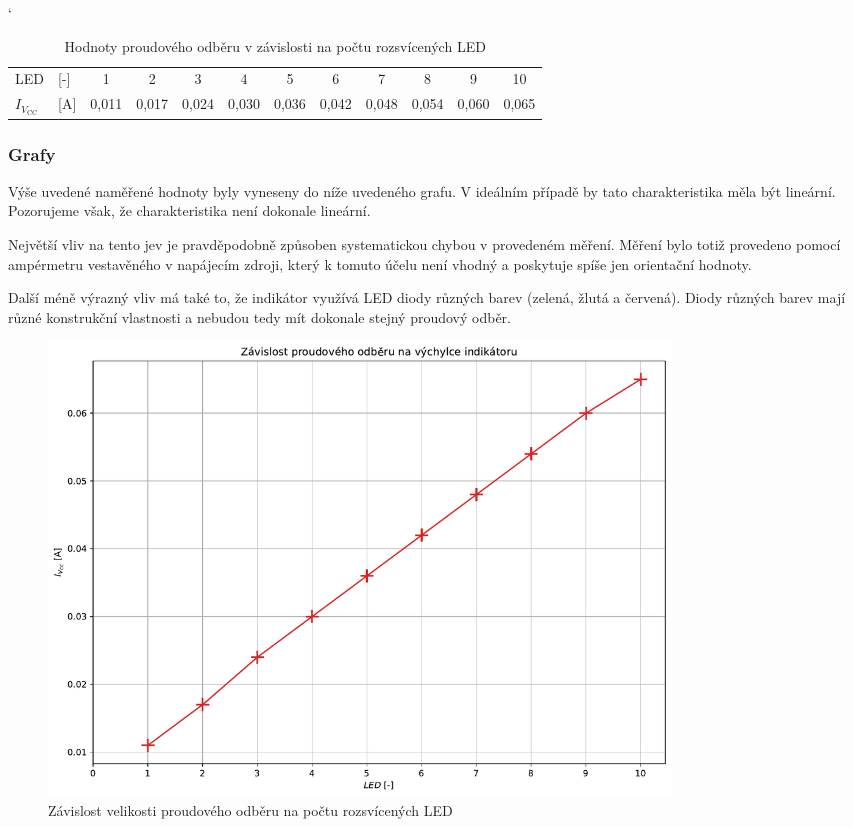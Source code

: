 \documentclass[a4paper, czech]{article}
\begin{document}
\begin{table}[H]
    \catcode`
    \centering
    \caption{Hodnoty proudového odběru v závislosti na počtu rozsvícených LED}
    \begin{tabular}{ll|cccccccccc}
        \toprule
        LED & [-]              & 1     & 2     & 3     & 4     & 5     & 6     & 7     & 8     & 9     & 10    \\
        \cmidrule(rl){1-12}
        $I_{V_{\text{CC}}}$ & {[}A{]} & 0,011 & 0,017 & 0,024 & 0,030 & 0,036 & 0,042 & 0,048 & 0,054 & 0,060 & 0,065 \\
        \bottomrule
    \end{tabular}
\end{table}

\subsubsection{Grafy}

Výše uvedené naměřené hodnoty byly vyneseny do níže uvedeného grafu.
V ideálním případě by tato charakteristika měla být lineární.
Pozorujeme však, že charakteristika není dokonale lineární.

Největší vliv na tento jev je pravděpodobně způsoben systematickou chybou v provedeném měření.
Měření bylo totiž provedeno pomocí ampérmetru vestavěného v napájecím zdroji, který k tomuto účelu není vhodný a poskytuje spíše jen orientační hodnoty.

Další méně výrazný vliv má také to, že indikátor využívá LED diody různých barev (zelená, žlutá a červená).
Diody různých barev mají různé konstrukční vlastnosti a nebudou tedy mít dokonale stejný proudový odběr.

\begin{figure}[H]
    \centering
    \includegraphics[width=0.8\textwidth]{grafy/graf3.pdf}
    \caption{Závislost velikosti proudového odběru na počtu rozsvícených LED}
\end{figure}
\end{document}
